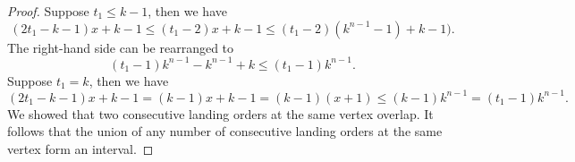 \documentclass[10pt,a4paper]{amsart}
\begin{document}
\begin{proof}
     Suppose $t_1 \leq k-1$, then we have
     \[(2t_1-k-1) x+k-1 \leq (t_1-2) x+k-1 \leq (t_1-2)(k^{n-1} -1) + k-1).\]
    The right-hand side can be rearranged to
    \[(t_1 - 1)k^{n-1} - k^{n-1} + k  \leq  (t_1 - 1)k^{n-1}.\]
    Suppose $t_1 = k$, then we have 
     \[(2t_1-k-1) x+k-1 = (k-1) x+k-1 = (k-1)(x+1) \leq (k-1) k^{n-1} = (t_1-1) k^{n-1}.\]
     We showed that two consecutive landing orders at the same vertex overlap. It follows that the union of any number of consecutive landing orders at the same vertex form an interval.
\end{proof}
\end{document}
